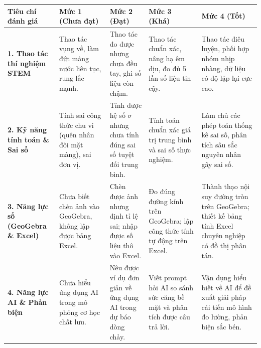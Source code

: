 \documentclass[12pt, a4paper]{article}
\begin{document}
\begin{center}
\renewcommand{\arraystretch}{1.25}
\begin{tabularx}{\textwidth}{|p{2.8cm}|X|X|X|X|}
    \hline
    \textbf{Tiêu chí đánh giá} & \textbf{Mức 1 (Chưa đạt)} & \textbf{Mức 2 (Đạt)} & \textbf{Mức 3 (Khá)} & \textbf{Mức 4 (Tốt)} \\
    \hline
    \textbf{1. Thao tác thí nghiệm STEM} & Thao tác vụng về, làm đứt màng nước liên tục, rung lắc mạnh. & Thao tác đo được nhưng chưa đều tay, ghi số liệu còn chậm. & Thao tác chuẩn xác, nâng hạ êm dịu, đo đủ 5 lần số liệu tin cậy. & Thao tác điêu luyện, phối hợp nhóm nhịp nhàng, dữ liệu có độ lặp lại cực cao. \\
    \hline
    \textbf{2. Kỹ năng tính toán \& Sai số} & Tính sai công thức chu vi (quên nhân đôi mặt màng), sai đơn vị. & Tính được hệ số $\sigma$ nhưng chưa tính đúng sai số tuyệt đối trung bình. & Tính toán chuẩn xác giá trị trung bình và sai số thực nghiệm. & Làm chủ các phép toán thống kê sai số, phân tích sâu sắc nguyên nhân gây sai số. \\
    \hline
    \textbf{3. Năng lực số (GeoGebra \& Excel)} & Chưa biết chèn ảnh vào GeoGebra, không lập được bảng Excel. & Chèn được ảnh nhưng định tỉ lệ sai; nhập được số liệu thô vào Excel. & Đo đúng đường kính trên GeoGebra; lập công thức tính tự động trên Excel. & Thành thạo nội suy đường tròn trên GeoGebra; thiết kế bảng tính Excel chuyên nghiệp có đồ thị phân tán. \\
    \hline
    \textbf{4. Năng lực AI \& Phản biện} & Chưa hiểu ứng dụng AI trong mô phỏng cơ học chất lưu. & Nêu được ví dụ đơn giản về ứng dụng AI trong dự báo dòng chảy. & Viết prompt hỏi AI so sánh sức căng bề mặt và phân tích được câu trả lời. & Vận dụng hiểu biết về AI để đề xuất giải pháp cải tiến mô hình đo lường, phản biện sắc bén. \\
    \hline
\end{tabularx}
\end{center}
\end{document}
